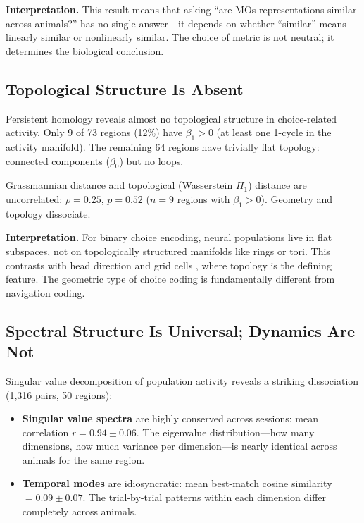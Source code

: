 \documentclass{article}
\begin{document}
\textbf{Interpretation.} This result means that asking ``are MOs representations similar across animals?'' has no single answer—it depends on whether ``similar'' means linearly similar or nonlinearly similar. The choice of metric is not neutral; it determines the biological conclusion.

\subsection{Topological Structure Is Absent}

Persistent homology reveals almost no topological structure in choice-related activity. Only 9 of 73 regions (12\%) have $\beta_1 > 0$ (at least one 1-cycle in the activity manifold). The remaining 64 regions have trivially flat topology: connected components ($\beta_0$) but no loops.

Grassmannian distance and topological (Wasserstein $H_1$) distance are uncorrelated: $\rho = 0.25$, $p = 0.52$ ($n = 9$ regions with $\beta_1 > 0$). Geometry and topology dissociate.

\textbf{Interpretation.} For binary choice encoding, neural populations live in flat subspaces, not on topologically structured manifolds like rings or tori. This contrasts with head direction \citep{gardner2022toroidal} and grid cells \citep{rybakken2019decoding}, where topology is the defining feature. The geometric type of choice coding is fundamentally different from navigation coding.

\subsection{Spectral Structure Is Universal; Dynamics Are Not}

Singular value decomposition of population activity reveals a striking dissociation (1,316 pairs, 50 regions):

\begin{itemize}
\item \textbf{Singular value spectra} are highly conserved across sessions: mean correlation $r = 0.94 \pm 0.06$. The eigenvalue distribution—how many dimensions, how much variance per dimension—is nearly identical across animals for the same region.
\item \textbf{Temporal modes} are idiosyncratic: mean best-match cosine similarity $= 0.09 \pm 0.07$. The trial-by-trial patterns within each dimension differ completely across animals.
\end{itemize}
\end{document}
